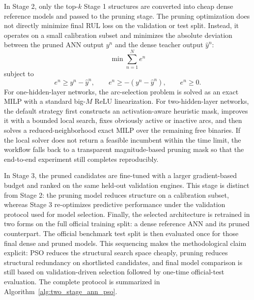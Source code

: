 In Stage 2, only the top-$k$ Stage 1 structures are converted into cheap dense reference models and passed to the pruning stage. The pruning optimization does not directly minimize final RUL loss on the validation or test split. Instead, it operates on a small calibration subset and minimizes the absolute deviation between the pruned ANN output $y^n$ and the dense teacher output $\hat{y}^n$:
\begin{equation}
    \min \sum_{n=1}^{N} e^n
    \label{eq:pruning_teacher_objective}
\end{equation}
subject to
\begin{equation}
    e^n \ge y^n - \hat{y}^n, \qquad
    e^n \ge -(y^n - \hat{y}^n), \qquad
    e^n \ge 0.
    \label{eq:pruning_absolute_error}
\end{equation}
For one-hidden-layer networks, the arc-selection problem is solved as an exact MILP with a standard big-$M$ ReLU linearization. For two-hidden-layer networks, the default strategy first constructs an activation-aware heuristic mask, improves it with a bounded local search, fixes obviously active or inactive arcs, and then solves a reduced-neighborhood exact MILP over the remaining free binaries. If the local solver does not return a feasible incumbent within the time limit, the workflow falls back to a transparent magnitude-based pruning mask so that the end-to-end experiment still completes reproducibly.

In Stage 3, the pruned candidates are fine-tuned with a larger gradient-based budget and ranked on the same held-out validation engines. This stage is distinct from Stage 2: the pruning model reduces structure on a calibration subset, whereas Stage 3 re-optimizes predictive performance under the validation protocol used for model selection. Finally, the selected architecture is retrained in two forms on the full official training split: a dense reference ANN and its pruned counterpart. The official benchmark test split is then evaluated once for those final dense and pruned models. This sequencing makes the methodological claim explicit: PSO reduces the structural search space cheaply, pruning reduces structural redundancy on shortlisted candidates, and final model comparison is still based on validation-driven selection followed by one-time official-test evaluation. The complete protocol is summarized in Algorithm~\ref{alg:two_stage_ann_pso}.

